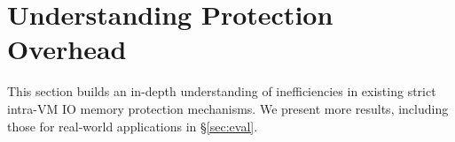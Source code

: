 \section{Understanding Protection Overhead}
\label{sec:inefficiencies}
This section builds an in-depth understanding of inefficiencies in existing strict intra-VM IO memory protection mechanisms. We present more results, including those for real-world applications 
  in \S\ref{sec:eval}.



